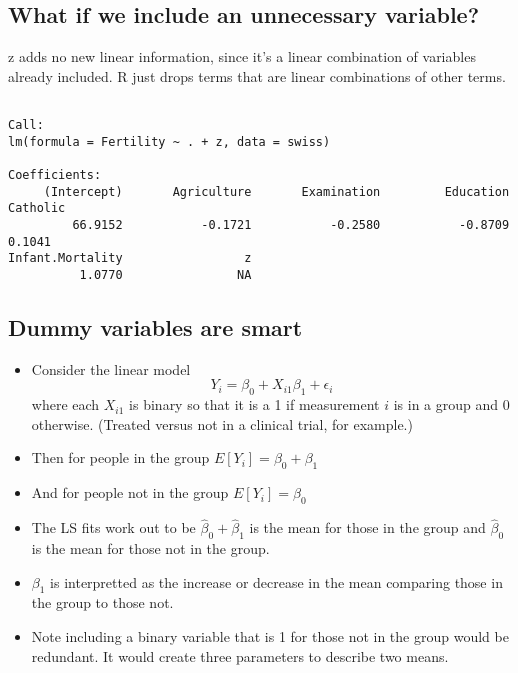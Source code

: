 \documentclass[12pt,openright,oneside,a4paper,chapter=TITLE,section=TITLE,subsection=Title,english,french,spanish,portugues,sumario=tradicional]{04-class-files/abntex2}
\newenvironment{Shaded}{\begin{snugshade}}{\end{snugshade}}
\newcommand{\DataTypeTok}[1]{\textcolor[rgb]{0.13,0.29,0.53}{#1}}
\newcommand{\KeywordTok}[1]{\textcolor[rgb]{0.13,0.29,0.53}{\textbf{#1}}}
\newcommand{\NormalTok}[1]{#1}
\newcommand{\OperatorTok}[1]{\textcolor[rgb]{0.81,0.36,0.00}{\textbf{#1}}}
\newcommand{\StringTok}[1]{\textcolor[rgb]{0.31,0.60,0.02}{#1}}
\providecommand{\tightlist}{%
  \setlength{\itemsep}{0pt}\setlength{\parskip}{0pt}}
\begin{document}
\hypertarget{what-if-we-include-an-unnecessary-variable}{%
\subsection{What if we include an unnecessary variable?}\label{what-if-we-include-an-unnecessary-variable}}

z adds no new linear information, since it's a linear
combination of variables already included. R just drops
terms that are linear combinations of other terms.

\begin{Shaded}
\end{Shaded}

\begin{verbatim}

Call:
lm(formula = Fertility ~ . + z, data = swiss)

Coefficients:
     (Intercept)       Agriculture       Examination         Education          Catholic  
         66.9152           -0.1721           -0.2580           -0.8709            0.1041  
Infant.Mortality                 z  
          1.0770                NA  
\end{verbatim}

\hypertarget{dummy-variables-are-smart}{%
\subsection{Dummy variables are smart}\label{dummy-variables-are-smart}}

\begin{itemize}
\tightlist
\item
  Consider the linear model
  \[
  Y_i = \beta_0 + X_{i1} \beta_1 + \epsilon_{i}
  \]
  where each \(X_{i1}\) is binary so that it is a 1 if measurement \(i\) is in a group and 0 otherwise. (Treated versus not in a clinical trial, for example.)
\item
  Then for people in the group \(E[Y_i] = \beta_0 + \beta_1\)
\item
  And for people not in the group \(E[Y_i] = \beta_0\)
\item
  The LS fits work out to be \(\hat \beta_0 + \hat \beta_1\) is the mean for those in the group and \(\hat \beta_0\) is the mean for those not in the group.
\item
  \(\beta_1\) is interpretted as the increase or decrease in the mean comparing those in the group to those not.
\item
  Note including a binary variable that is 1 for those not in the group would be redundant. It would create three parameters to describe two means.
\end{itemize}
\end{document}
